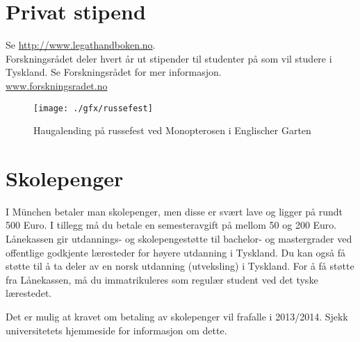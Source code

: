 \section{Privat stipend}
Se \url{http://www.legathandboken.no}. \\
Forskningsrådet deler hvert år ut stipender til studenter på som vil studere i Tyskland. Se Forskningsrådet for mer informasjon. \\
\url{www.forskningsradet.no}

\begin{figure}[h]
\center
\texttt{[image: ./gfx/russefest]}
\caption{Haugalending på russefest ved Monopterosen i Englischer Garten}
\end{figure}

\section{Skolepenger}

I München betaler man skolepenger, men disse er svært lave og ligger på rundt 500 Euro. I tillegg må du betale en semesteravgift på mellom 50 og 200 Euro. Lånekassen gir utdannings- og skolepengestøtte til bachelor- og mastergrader ved offentlige godkjente læresteder for høyere utdanning i Tyskland. Du kan også få støtte til å ta deler av en norsk utdanning (utveksling) i Tyskland. For å få støtte fra Lånekassen, må du immatrikuleres som regulær student ved det tyske lærestedet.

Det er mulig at kravet om betaling av skolepenger vil frafalle i 2013/2014. Sjekk universitetets hjemmeside for informasjon om dette.


